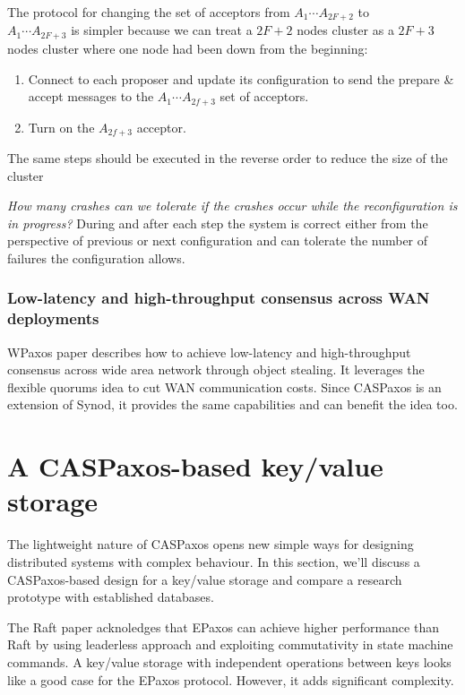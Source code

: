 \documentclass[12pt]{article}
\theoremstyle{definition}
\begin{document}
The protocol for changing the set of acceptors from $A_1 \cdots A_{2F+2}$ to \\
$A_1 \cdots A_{2F+3}$ is simpler because we can treat a $2F+2$ nodes cluster as a $2F+3$ nodes cluster where one node had been down from the beginning:
\begin{enumerate}
  \item Connect to each proposer and update its configuration to send the prepare \& accept messages to the $A_1 \cdots A_{2f+3}$ set of acceptors.
  \item Turn on the $A_{2f+3}$ acceptor.
\end{enumerate}

The same steps should be executed in the reverse order to reduce the size of the cluster

{\it How many crashes can we tolerate if the crashes occur while the reconfiguration is in progress?} During and after each step the system is correct either from the perspective of previous or next configuration and can tolerate the number of failures the configuration allows.

\subsubsection{Low-latency and high-throughput consensus across WAN deployments}

WPaxos\cite{wpaxos} paper describes how to achieve low-latency and high-throughput consensus across wide area network through object stealing. It leverages the flexible quorums\cite{fpaxos} idea to cut WAN communication costs. Since CASPaxos is an extension of Synod, it provides the same capabilities and can benefit the idea too.

\section{A CASPaxos-based key/value storage}

The lightweight nature of CASPaxos opens new simple ways for designing distributed systems with complex behaviour. In this section, we'll discuss a CASPaxos-based design for a key/value storage and compare a research prototype with established databases.

The Raft paper acknoledges\cite{raft} that EPaxos\cite{epaxos} can achieve higher performance than Raft by using leaderless approach and exploiting commutativity in state machine commands. A key/value storage with independent operations between keys looks like a good case for the EPaxos protocol. However, it adds significant complexity.
\end{document}
